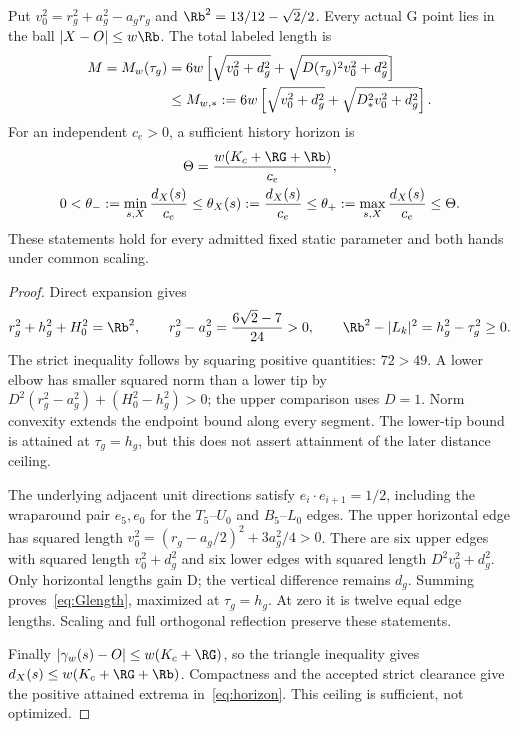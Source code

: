 \begin{proposition}\label{prop:geometry}
Put $v_0^2=r_g^2+a_g^2-a_gr_g$ and $\Rb^2=13/12-\sqrt2/2$. Every actual G point lies in the ball $|X-O|\le w\Rb$. The total labeled length is
\begin{align}
M=M_w(\tau_g)&=6w\left[\sqrt{v_0^2+d_g^2}+\sqrt{D(\tau_g)^2v_0^2+d_g^2}\right]\label{eq:Glength}\\
&\le M_{w,*}:=6w\left[\sqrt{v_0^2+d_g^2}+\sqrt{D_*^2v_0^2+d_g^2}\right].\notag
\end{align}
For an independent $c_e>0$, a sufficient history horizon is
\begin{equation}\label{eq:horizon}
\begin{gathered}
\Theta=\frac{w(K_c+\RG+\Rb)}{c_e},\\
0<\theta_-:=\min_{s,X}\frac{d_X(s)}{c_e}
\le\theta_X(s):=\frac{d_X(s)}{c_e}
\le\theta_+:=\max_{s,X}\frac{d_X(s)}{c_e}\le\Theta.
\end{gathered}
\end{equation}
These statements hold for every admitted fixed static parameter and both hands under common scaling.
\end{proposition}
\begin{proof}
Direct expansion gives
\begin{equation}\label{eq:ballmargin}
r_g^2+h_g^2+H_0^2=\Rb^2,\qquad
r_g^2-a_g^2=\frac{6\sqrt2-7}{24}>0,\qquad
\Rb^2-|L_k|^2=h_g^2-\tau_g^2\ge0.
\end{equation}
The strict inequality follows by squaring positive quantities: $72>49$. A lower elbow has smaller squared norm than a lower tip by
$D^2(r_g^2-a_g^2)+(H_0^2-h_g^2)>0$; the upper comparison uses $D=1$. Norm convexity extends the endpoint bound along every segment. The lower-tip bound is attained at $\tau_g=h_g$, but this does not assert attainment of the later distance ceiling.

The underlying adjacent unit directions satisfy $e_i\cdot e_{i+1}=1/2$, including the wraparound pair $e_5,e_0$ for the $T_5$--$U_0$ and $B_5$--$L_0$ edges. The upper horizontal edge has squared length
$v_0^2=(r_g-a_g/2)^2+3a_g^2/4>0$.
There are six upper edges with squared length $v_0^2+d_g^2$ and six lower edges with squared length $D^2v_0^2+d_g^2$. Only horizontal lengths gain D; the vertical difference remains $d_g$. Summing proves~\eqref{eq:Glength}, maximized at $\tau_g=h_g$. At zero it is twelve equal edge lengths. Scaling and full orthogonal reflection preserve these statements.

Finally $|\gamma_w(s)-O|\le w(K_c+\RG)$, so the triangle inequality gives $d_X(s)\le w(K_c+\RG+\Rb)$. Compactness and the accepted strict clearance give the positive attained extrema in~\eqref{eq:horizon}. This ceiling is sufficient, not optimized.
\end{proof}

